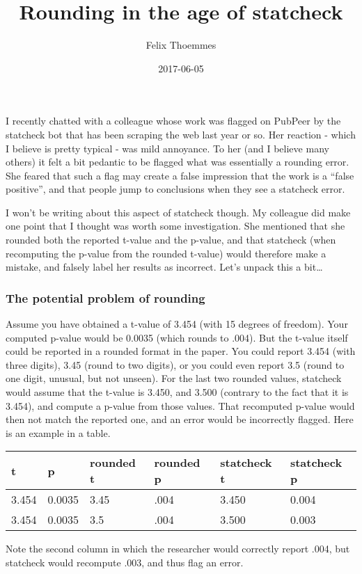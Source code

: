 \documentclass[]{article}
\title{Rounding in the age of statcheck}
\author{Felix Thoemmes}
\date{2017-06-05}
\begin{document}
\maketitle

I recently chatted with a colleague whose work was flagged on PubPeer by
the statcheck bot that has been scraping the web last year or so. Her
reaction - which I believe is pretty typical - was mild annoyance. To
her (and I believe many others) it felt a bit pedantic to be flagged
what was essentially a rounding error. She feared that such a flag may
create a false impression that the work is a ``false positive'', and
that people jump to conclusions when they see a statcheck error.

I won't be writing about this aspect of statcheck though. My colleague
did make one point that I thought was worth some investigation. She
mentioned that she rounded both the reported t-value and the p-value,
and that statcheck (when recomputing the p-value from the rounded
t-value) would therefore make a mistake, and falsely label her results
as incorrect. Let's unpack this a bit\ldots{}

\subsubsection{The potential problem of
rounding}\label{the-potential-problem-of-rounding}

Assume you have obtained a t-value of 3.454 (with 15 degrees of
freedom). Your computed p-value would be 0.0035 (which rounds to .004).
But the t-value itself could be reported in a rounded format in the
paper. You could report 3.454 (with three digits), 3.45 (round to two
digits), or you could even report 3.5 (round to one digit, unusual, but
not unseen). For the last two rounded values, statcheck would assume
that the t-value is 3.450, and 3.500 (contrary to the fact that it is
3.454), and compute a p-value from those values. That recomputed p-value
would then not match the reported one, and an error would be incorrectly
flagged. Here is an example in a table.

\begin{longtable}[]{@{}llllll@{}}
\toprule
t & p & rounded t & rounded p & statcheck t & statcheck p\tabularnewline
\midrule
\endhead
3.454 & 0.0035 & 3.45 & .004 & 3.450 & 0.004\tabularnewline
3.454 & 0.0035 & 3.5 & .004 & 3.500 & 0.003\tabularnewline
\bottomrule
\end{longtable}

Note the second column in which the researcher would correctly report
.004, but statcheck would recompute .003, and thus flag an error.
\end{document}
